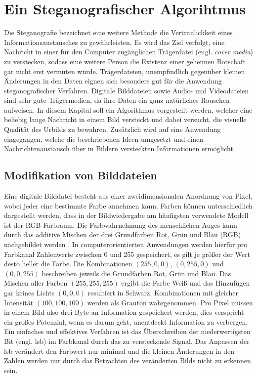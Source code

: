 \chapter{Ein Steganografischer Algorihtmus} \label{cha:steganografie}
Die Steganografie bezeichnet eine weitere Methode die Vertraulichkeit eines
Informationsaustausches zu gewährleisten.
Es wird das Ziel verfolgt, eine Nachricht in einer für den Computer
zugänglichen Trägerdatei (engl. \textit{cover media}) zu verstecken, sodass eine
weitere Person die Existenz
einer geheimen Botschaft gar nicht erst vermuten würde. Trägerdateien, unempfindlich
gegenüber kleinen Änderungen in den Daten eignen sich besonders gut für die
Anwendung steganografischer Verfahren. Digitale Bilddateien sowie Audio- und Videodateien
sind sehr gute Trägermedien,
da ihre Daten ein ganz natürliches Rauschen aufweisen.
In diesem Kapital soll ein Algorithmus vorgestellt werden, welcher
eine beliebig lange Nachricht in einem Bild versteckt und dabei versucht,
die visuelle Qualität des Urbilds zu bewahren.
Zusätzlich wird auf eine Anwendung eingegangen, welche die beschriebenen
Ideen umgesetzt und einen Nachrichtenaustausch über
in Bildern versteckten Informationen ermöglicht.

\section{Modifikation von Bilddateien}
Eine digitale Bilddatei besteht aus einer zweidimensionalen Anordnung von Pixel, wobei
jeder eine bestimmte Farbe annehmen kann. Farben können unterschiedlich
dargestellt werden, dass in der Bildwiedergabe am häufigsten verwendete Modell ist
der RGB-Farbraum. Die Farbwahrnehmung des menschlichen Auges kann durch
das additive Mischen der drei Grundfarben Rot, Grün und Blau (RGB)
nachgebildet werden \parencite[32-40]{BOOK:VC}. In computerorientierten Anwendungen
werden hierfür pro Farbkanal Zahlenwerte zwischen 0 und 255 gespeichert,
es gilt je größer der Wert desto heller die Farbe. Die Kombinationen
$(255,0,0)$, $(0,255,0)$ und $(0,0,255)$ beschreiben jeweils die Grundfarben Rot, Grün und Blau.
Das Mischen aller Farben $(255,255,255)$ ergibt die Farbe Weiß und das Hinzufügen
gar keines Lichts $(0,0,0)$ resultiert in Schwarz. Kombinationen mit gleicher Intensität
$(100,100,100)$ werden als Grauton wahrgenommen. Pro Pixel müssen in einem Bild
also drei Byte an Information gespeichert werden, dies verspricht ein großes
Potenzial, wenn es darum geht, unentdeckt Information zu verbergen. Ein
einfaches und effektives Verfahren ist das Überschreiben der niederwertigsten
Bit (engl. \ac{lsb}) im Farbkanal
durch das zu versteckende Signal. Das Anpassen
der \acs{lsb} verändert den Farbwert nur minimal und
die kleinen Änderungen in den Zahlen werden nur durch das
Betrachten des veränderten Bilds nicht zu erkennen sein.

